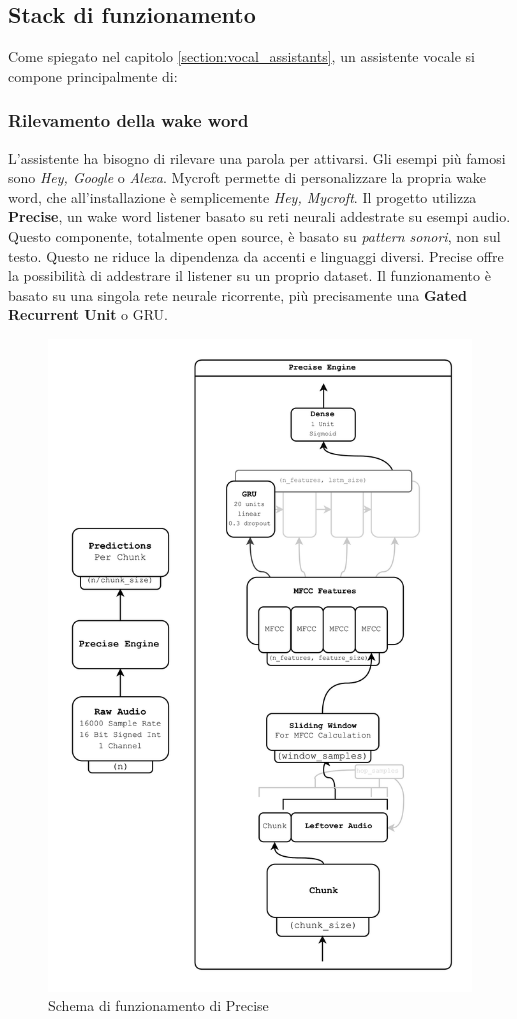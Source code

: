 \subsection{Stack di funzionamento}
Come spiegato nel capitolo \ref{section:vocal_assistants}, un assistente vocale si compone principalmente di:
\subsubsection{Rilevamento della wake word}
L'assistente ha bisogno di rilevare una parola per attivarsi. Gli esempi più famosi sono \textit{Hey, Google} o \textit{Alexa}. Mycroft permette di personalizzare la propria wake word, che all'installazione è semplicemente \textit{Hey, Mycroft}. Il progetto utilizza \textbf{Precise}, un wake word listener basato su reti neurali addestrate su esempi audio. Questo componente, totalmente open source, è basato su \textit{pattern sonori}, non sul testo. Questo ne riduce la dipendenza da accenti e linguaggi diversi. Precise offre la possibilità di addestrare il listener su un proprio dataset. Il funzionamento è basato su una singola rete neurale ricorrente, più precisamente una \textbf{Gated Recurrent Unit} o GRU.
\begin{figure}[H]
    \begin{center}
        \includegraphics[width=0.6\columnwidth]{images/mycroft/precise.png}
    \end{center}
    \caption{Schema di funzionamento di Precise}
    \label{fig:precise}
\end{figure}
